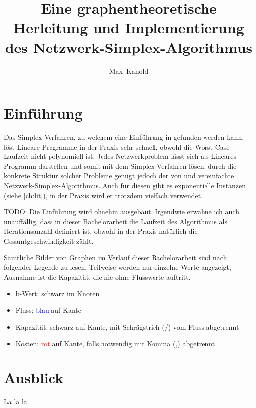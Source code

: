 \documentclass[11pt,a4paper,twoside,ngerman,openany]{scrbook}
\author{Max~Kanold}
\title{Eine graphentheoretische Herleitung und Implementierung des Netzwerk-Simplex-Algorithmus}
\theoremstyle{plain}
\theoremstyle{definition}
\begin{document}
\frontmatter
\maketitle
\cleardoublepage
\tableofcontents
\cleardoublepage

\mainmatter
\chapter{Einführung}
Das Simplex-Verfahren, zu welchem eine Einführung in \cite[Chvátal, 2002]{NSAbook} gefunden werden kann, löst Lineare Programme in der Praxis sehr schnell, obwohl die Worst-Case-Laufzeit nicht polynomiell ist. Jedes Netzwerkproblem lässt sich als Lineares Programm darstellen und somit mit dem Simplex-Verfahren lösen, durch die konkrete Struktur solcher Probleme genügt jedoch der von \cite[Dantzig, 1951]{erf1} und \cite[Orden, 1956]{erf2} vereinfachte Netzwerk-Simplex-Algorithmus. Auch für diesen gibt es exponentielle Instanzen (siehe \cref{ch:lit}), in der Praxis wird er trotzdem vielfach verwendet.

TODO: Die Einführung wird ohnehin ausgebaut. Irgendwie erwähne ich auch unauffällig, dass in dieser Bachelorarbeit die Laufzeit des Algorithmus als Iterationsanzahl definiert ist, obwohl in der Praxis natürlich die Gesamtgeschwindigkeit zählt.

Sämtliche Bilder von Graphen im Verlauf dieser Bachelorarbeit sind nach folgender Legende zu lesen. Teilweise werden nur einzelne Werte angezeigt, Ausnahme ist die Kapazität, die nie ohne Flusswerte auftritt.
\begin{itemize}\itemsep0em
    \item b-Wert: schwarz im Knoten
    \item Fluss: \textcolor{blue}{blau} auf Kante
    \item Kapazität: schwarz auf Kante, mit Schrägstrich (/) vom Fluss abgetrennt
    \item Kosten: \textcolor{red}{rot} auf Kante, falls notwendig mit Komma (,) abgetrennt
\end{itemize}






\chapter{Ausblick}
La la la.

\backmatter
{}

\end{document}
